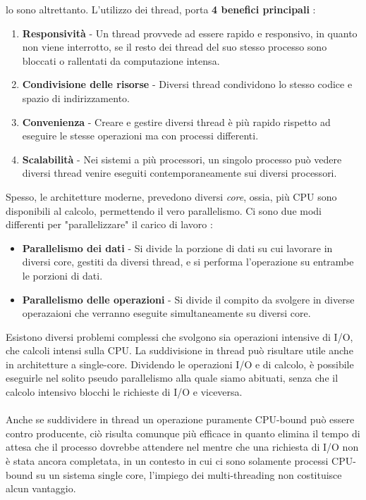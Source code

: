 \documentclass[12pt, letterpaper]{article}
\newcommand{\acc}{\\\hphantom{}\\}
\begin{document}
lo sono altrettanto. L'utilizzo dei thread, porta \textbf{4 benefici principali} : \begin{enumerate}
    \item \textbf{Responsività} - Un thread provvede ad essere rapido e responsivo, in quanto non viene interrotto, se il resto 
    dei thread del suo stesso processo sono bloccati o rallentati da computazione intensa.
    \item \textbf{Condivisione delle risorse} - Diversi thread condividono lo stesso codice e spazio di indirizzamento.
    \item \textbf{Convenienza} - Creare e gestire diversi thread è più rapido rispetto ad eseguire le stesse operazioni ma con 
    processi differenti. 
    \item \textbf{Scalabilità} - Nei sistemi a più processori, un singolo processo può vedere diversi thread venire 
    eseguiti contemporaneamente sui diversi processori.
\end{enumerate}
Spesso, le architetture moderne, prevedono diversi \textit{core}, ossia, più CPU sono disponibili al calcolo, 
permettendo il vero parallelismo. Ci sono due modi differenti per "parallelizzare" il carico di lavoro :\begin{itemize}
    \item \textbf{Parallelismo dei dati} - Si divide la porzione di dati su cui lavorare in diversi core, gestiti 
    da diversi thread, e si performa l'operazione su entrambe le porzioni di dati.
    \item \textbf{Parallelismo delle operazioni} - Si divide il compito da svolgere in diverse operazaioni che verranno 
    eseguite simultaneamente su diversi core.
\end{itemize}
Esistono diversi problemi complessi che svolgono sia operazioni intensive di I/O, che calcoli 
intensi sulla CPU. La suddivisione in thread può risultare utile anche in architetture a single-core. Dividendo le operazioni 
I/O e di calcolo, è possibile eseguirle nel solito pseudo parallelismo alla quale siamo abituati, senza che 
il calcolo intensivo blocchi le richieste di I/O e viceversa. \acc Anche se suddividere in thread un operazione 
puramente CPU-bound può essere contro producente, ciò risulta comunque più efficace in quanto elimina il tempo di attesa 
che il processo dovrebbe attendere nel mentre che una richiesta di I/O non è stata ancora completata, in un contesto in cui 
ci sono solamente processi CPU-bound su un sistema single core, l'impiego dei multi-threading non costituisce alcun vantaggio.
\end{document}
